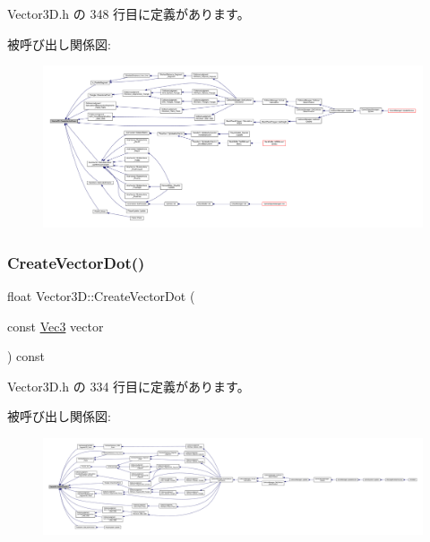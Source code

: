  Vector3\+D.\+h の 348 行目に定義があります。

被呼び出し関係図\+:
\nopagebreak
\begin{figure}[H]
\begin{center}
\leavevmode
\includegraphics[width=350pt]{class_vector3_d_accbd42535a385947ac5380084f2c688c_icgraph}
\end{center}
\end{figure}
\mbox{\label{class_vector3_d_aed4c9936346cfbcb7238bd64ae1601d3}} 
\subsubsection{\texorpdfstring{Create\+Vector\+Dot()}{CreateVectorDot()}}
{\footnotesize\ttfamily float Vector3\+D\+::\+Create\+Vector\+Dot (\begin{DoxyParamCaption}\item[{const \mbox{\hyperlink{_vector3_d_8h_ab16f59e4393f29a01ec8b9bbbabbe65d}{Vec3}}}]{vector }\end{DoxyParamCaption}) const\hspace{0.3cm}{\ttfamily [inline]}}



 Vector3\+D.\+h の 334 行目に定義があります。

被呼び出し関係図\+:
\nopagebreak
\begin{figure}[H]
\begin{center}
\leavevmode
\includegraphics[width=350pt]{class_vector3_d_aed4c9936346cfbcb7238bd64ae1601d3_icgraph}
\end{center}
\end{figure}
\mbox{\label{class_vector3_d_a8b10872079076291bbbc81b7d48aa514}} 

